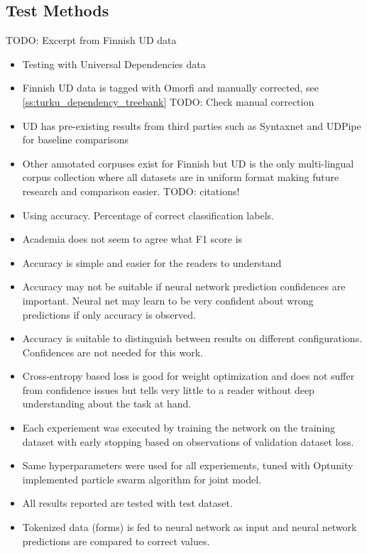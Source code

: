 \documentclass[12pt,a4paper,english
]{tutthesis}
\newcommand\todo[1]{{\color{red}TODO: #1}} %
\begin{document}
\subsection{Test Methods}
\label{ss:test_methods}
\todo{Excerpt from Finnish UD data}
\begin{itemize}
\item Testing with Universal Dependencies data
\item Finnish UD data is tagged with Omorfi and manually corrected, see \ref{ss:turku_dependency_treebank} \todo{Check manual correction}
\item UD has pre-existing results from third parties such as Syntaxnet and UDPipe for baseline comparisons
\item Other annotated corpuses exist for Finnish but UD is the only multi-lingual corpus collection where all datasets are in uniform format making future research and comparison easier. \todo{citations!}
\item Using accuracy. Percentage of correct classification labels.
\item Academia does not seem to agree what F1 score is
\item Accuracy is simple and easier for the readers to understand
\item Accuracy may not be suitable if neural network prediction confidences are important. Neural net may learn to be very confident about wrong predictions if only accuracy is observed.
\item Accuracy is suitable to distinguish between results on different configurations. Confidences are not needed for this work.
\item Cross-entropy based loss is good for weight optimization and does not suffer from confidence issues but tells very little to a reader without deep understanding about the task at hand.
\item Each experiement was executed by training the network on the training dataset with early stopping based on observations of validation dataset loss.
\item Same hyperparameters were used for all experiements, tuned with Optunity implemented particle swarm algorithm for joint model.
\item All results reported are tested with test dataset.
\item Tokenized data (forms) is fed to neural network as input and neural network predictions are compared to correct values.
\end{itemize}
\end{document}
